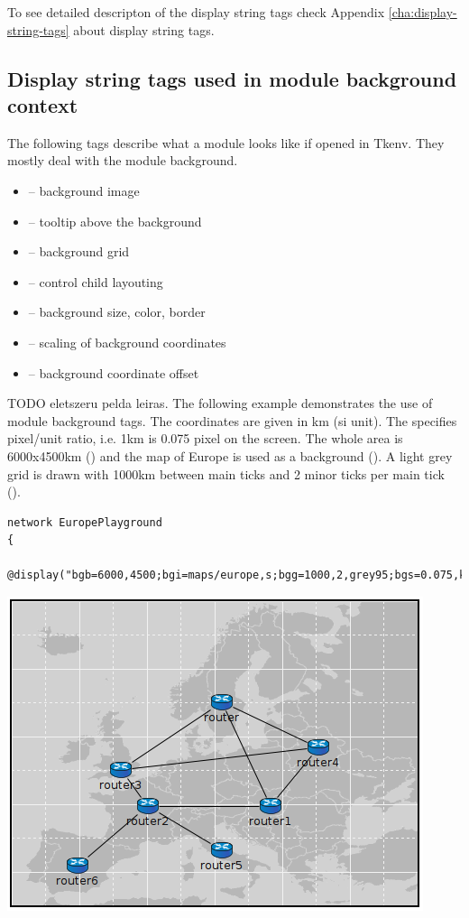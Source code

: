 To see detailed descripton of the display string tags check
Appendix \ref{cha:display-string-tags} about display string tags.

\subsection{Display string tags used in module background context}

The following tags describe what a module looks like if opened in
Tkenv. They mostly deal with the module background.

\begin{itemize}
  \item{ -- background image}
  \item{ -- tooltip above the background}
  \item{ -- background grid}
  \item{ -- control child layouting}
  \item{ -- background size, color, border}
  \item{ -- scaling of background coordinates}
  \item{ -- background coordinate offset}
\end{itemize}

TODO eletszeru pelda leiras.
The following example demonstrates the use of module background tags.
The coordinates are given in km (si unit). The 
specifies pixel/unit ratio, i.e. 1km is 0.075 pixel on the screen.
The whole area is 6000x4500km () and the map of Europe is used as a background ().
A light grey grid is drawn with 1000km between main ticks and 2 minor ticks per main tick
().

\begin{verbatim}
network EuropePlayground
{
    @display("bgb=6000,4500;bgi=maps/europe,s;bgg=1000,2,grey95;bgs=0.075,km");
\end{verbatim}

\begin{center}
\includegraphics{figures/graphics-bgtags}
\end{center}

